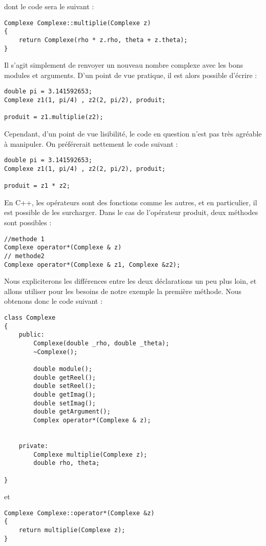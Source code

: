 dont le code sera le suivant :
\begin{lstlisting}[caption = complexe3.cpp]
Complexe Complexe::multiplie(Complexe z)
{
    return Complexe(rho * z.rho, theta + z.theta);
}
\end{lstlisting}

Il s'agit simplement de renvoyer un nouveau nombre complexe avec les bons modules et arguments. D'un point de vue pratique, il est alors possible d'\'ecrire :
\begin{lstlisting}
double pi = 3.141592653;
Complexe z1(1, pi/4) , z2(2, pi/2), produit;

produit = z1.multiplie(z2);
\end{lstlisting}

Cependant, d'un point de vue lisibilit\'e, le code en question n'est pas tr\`es agr\'eable \`a manipuler. On pr\'ef\'ererait nettement le code suivant :
\begin{lstlisting}
double pi = 3.141592653;
Complexe z1(1, pi/4) , z2(2, pi/2), produit;

produit = z1 * z2;
\end{lstlisting}

En C++, les op\'erateurs sont des fonctions comme les autres, et en particulier, il est possible de les surcharger. Dans le cas de l'op\'erateur produit,
deux m\'ethodes sont possibles :
\begin{lstlisting}
//methode 1
Complexe operator*(Complexe & z)
// methode2
Complexe operator*(Complexe & z1, Complexe &z2);
\end{lstlisting}

Nous expliciterons les diff\'erences entre les deux d\'eclarations un peu plus loin, et allons utiliser pour les besoins de notre exemple la premi\`ere m\'ethode.
Nous obtenons donc le code suivant :
\begin{lstlisting}[caption = complexe5.h]
class Complexe
{
    public:
        Complexe(double _rho, double _theta);
        ~Complexe();

        double module();
        double getReel();
        double setReel();
        double getImag();
        double setImag();
        double getArgument();
        Complex operator*(Complexe & z);


    private:
        Complexe multiplie(Complexe z);
        double rho, theta;

}
\end{lstlisting}

et
\begin{lstlisting}[caption = complexe5.cpp]
Complexe Complexe::operator*(Complexe &z)
{
    return multiplie(Complexe z);
}
\end{lstlisting}

